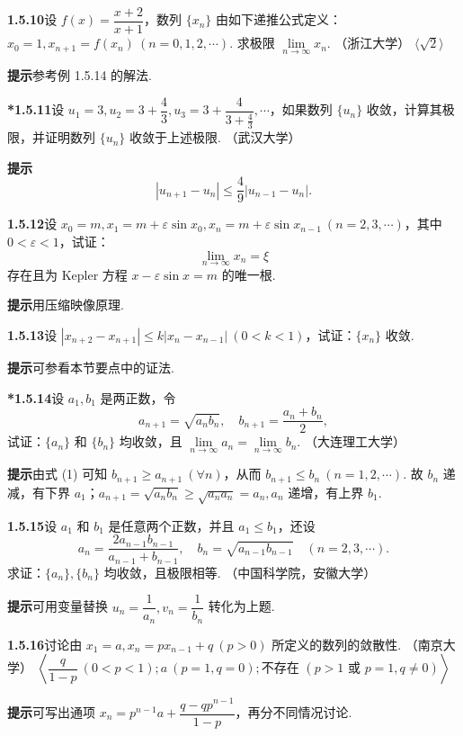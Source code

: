 \documentclass[UTF8,12pt,a4paper,fontset=fandol]{ctexart}
\begin{document}
\noindent\textbf{1.5.10}\quad 设 $f(x)=\dfrac{x+2}{x+1}$，数列 $\{x_n\}$ 由如下递推公式定义：$x_0=1,x_{n+1}=f(x_n)\ (n=0,1,2,\cdots)$. 求极限 $\lim\limits_{n\to\infty}x_n$. （浙江大学） \hfill $\langle\sqrt2\rangle$

\noindent\textbf{提示}\quad 参考例 1.5.14 的解法.

\noindent\textbf{*1.5.11}\quad 设 $u_1=3,u_2=3+\dfrac43,u_3=3+\dfrac4{3+\frac43},\cdots$，如果数列 $\{u_n\}$ 收敛，计算其极限，并证明数列 $\{u_n\}$ 收敛于上述极限. （武汉大学）

\noindent\textbf{提示}\quad
\[
  |u_{n+1}-u_n|\le \frac49|u_{n-1}-u_n|.
\]

\noindent\textbf{1.5.12}\quad 设 $x_0=m,x_1=m+\varepsilon\sin x_0,x_n=m+\varepsilon\sin x_{n-1}\ (n=2,3,\cdots)$，其中 $0<\varepsilon<1$，试证：
\[
  \lim_{n\to\infty}x_n=\xi
\]
存在且为 Kepler 方程 $x-\varepsilon\sin x=m$ 的唯一根.

\noindent\textbf{提示}\quad 用压缩映像原理.

\noindent\textbf{1.5.13}\quad 设 $|x_{n+2}-x_{n+1}|\le k|x_n-x_{n-1}|\ (0<k<1)$，试证：$\{x_n\}$ 收敛.

\noindent\textbf{提示}\quad 可参看本节要点中的证法.

\noindent\textbf{*1.5.14}\quad 设 $a_1,b_1$ 是两正数，令
\[
  a_{n+1}=\sqrt{a_nb_n},\quad b_{n+1}=\frac{a_n+b_n}{2},
\tag{1}
\]
试证：$\{a_n\}$ 和 $\{b_n\}$ 均收敛，且 $\lim\limits_{n\to\infty}a_n=\lim\limits_{n\to\infty}b_n$. （大连理工大学）

\noindent\textbf{提示}\quad 由式 (1) 可知 $b_{n+1}\ge a_{n+1}\ (\forall n)$，从而 $b_{n+1}\le b_n\ (n=1,2,\cdots)$. 故 $b_n$ 递减，有下界 $a_1$；$a_{n+1}=\sqrt{a_nb_n}\ge \sqrt{a_na_n}=a_n,a_n$ 递增，有上界 $b_1$.

\noindent\textbf{1.5.15}\quad 设 $a_1$ 和 $b_1$ 是任意两个正数，并且 $a_1\le b_1$，还设
\[
  a_n=\frac{2a_{n-1}b_{n-1}}{a_{n-1}+b_{n-1}},\quad
  b_n=\sqrt{a_{n-1}b_{n-1}}\quad (n=2,3,\cdots).
\]
求证：$\{a_n\},\{b_n\}$ 均收敛，且极限相等. （中国科学院，安徽大学）

\noindent\textbf{提示}\quad 可用变量替换 $u_n=\dfrac1{a_n},v_n=\dfrac1{b_n}$ 转化为上题.

\noindent\textbf{1.5.16}\quad 讨论由 $x_1=a,x_n=px_{n-1}+q\ (p>0)$ 所定义的数列的敛散性. （南京大学） \hfill $\left\langle\dfrac q{1-p}\ (0<p<1);a\ (p=1,q=0);\text{不存在 }(p>1\text{ 或 }p=1,q\ne0)\right\rangle$

\noindent\textbf{提示}\quad 可写出通项 $x_n=p^{n-1}a+\dfrac{q-qp^{n-1}}{1-p}$，再分不同情况讨论.
\end{document}
